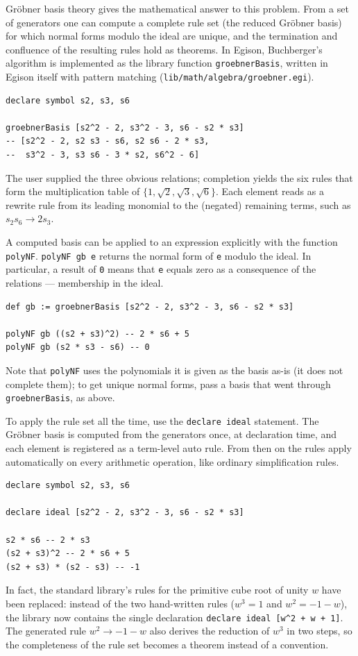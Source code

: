 Gr\"obner basis theory gives the mathematical answer to this problem.
From a set of generators one can compute a complete rule set (the reduced Gr\"obner basis) for which normal forms modulo the ideal are unique, and the termination and confluence of the resulting rules hold as theorems.
In Egison, Buchberger's algorithm is implemented as the library function \lstinline{groebnerBasis}, written in Egison itself with pattern matching (\texttt{lib/math/algebra/groebner.egi}).
\begin{lstlisting}[language=egison,numbers=none]
declare symbol s2, s3, s6

groebnerBasis [s2^2 - 2, s3^2 - 3, s6 - s2 * s3]
-- [s2^2 - 2, s2 s3 - s6, s2 s6 - 2 * s3,
--  s3^2 - 3, s3 s6 - 3 * s2, s6^2 - 6]
\end{lstlisting}
The user supplied the three obvious relations; completion yields the six rules that form the multiplication table of $\{1, \sqrt{2}, \sqrt{3}, \sqrt{6}\}$.
Each element reads as a rewrite rule from its leading monomial to the (negated) remaining terms, such as $s_2 s_6 \to 2 s_3$.

A computed basis can be applied to an expression explicitly with the function \lstinline{polyNF}.
\lstinline{polyNF gb e} returns the normal form of \lstinline{e} modulo the ideal.
In particular, a result of \lstinline{0} means that \lstinline{e} equals zero as a consequence of the relations --- membership in the ideal.
\begin{lstlisting}[language=egison,numbers=none]
def gb := groebnerBasis [s2^2 - 2, s3^2 - 3, s6 - s2 * s3]

polyNF gb ((s2 + s3)^2) -- 2 * s6 + 5
polyNF gb (s2 * s3 - s6) -- 0
\end{lstlisting}
Note that \lstinline{polyNF} uses the polynomials it is given as the basis as-is (it does not complete them); to get unique normal forms, pass a basis that went through \lstinline{groebnerBasis}, as above.

To apply the rule set all the time, use the \lstinline{declare ideal} statement.
The Gr\"obner basis is computed from the generators once, at declaration time, and each element is registered as a term-level auto rule.
From then on the rules apply automatically on every arithmetic operation, like ordinary simplification rules.
\begin{lstlisting}[language=egison,numbers=none]
declare symbol s2, s3, s6

declare ideal [s2^2 - 2, s3^2 - 3, s6 - s2 * s3]

s2 * s6 -- 2 * s3
(s2 + s3)^2 -- 2 * s6 + 5
(s2 + s3) * (s2 - s3) -- -1
\end{lstlisting}
In fact, the standard library's rules for the primitive cube root of unity $w$ have been replaced: instead of the two hand-written rules ($w^3 = 1$ and $w^2 = -1-w$), the library now contains the single declaration \lstinline{declare ideal [w^2 + w + 1]}.
The generated rule $w^2 \to -1-w$ also derives the reduction of $w^3$ in two steps, so the completeness of the rule set becomes a theorem instead of a convention.


